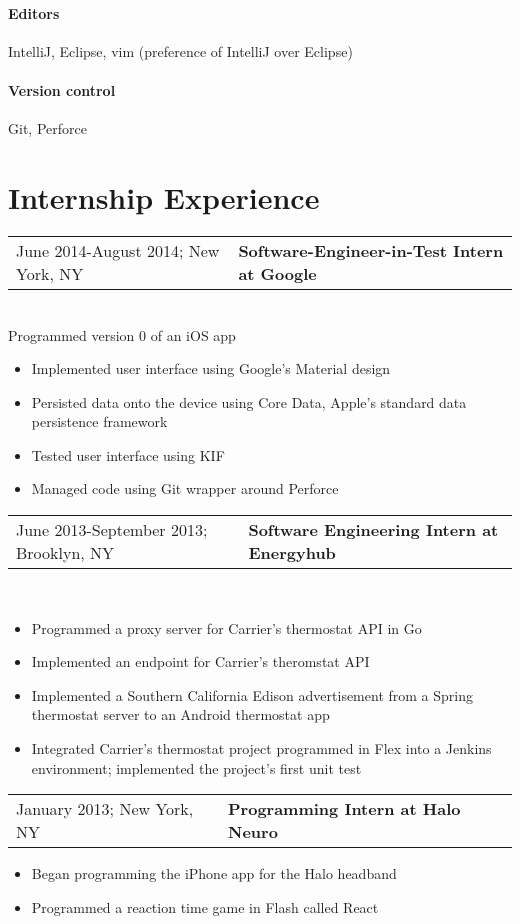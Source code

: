 \documentclass[letterpaper,10pt]{article} %
\begin{document}
\paragraph{Editors} IntelliJ, Eclipse, vim {\footnotesize (preference of IntelliJ over Eclipse)}
\paragraph{Version control} Git, Perforce

\section{Internship Experience}
\begin{tabular}{@{}p{3in}l}
    June 2014-August 2014; New York, NY & \textbf{Software-Engineer-in-Test Intern at Google}
\end{tabular} \\
Programmed version 0 of an iOS app
\begin{itemize}
    \item Implemented user interface using Google's Material design
    \item Persisted data onto the device using Core Data, Apple's standard data persistence framework
    \item Tested user interface using KIF
    \item Managed code using Git wrapper around Perforce
\end{itemize}

\begin{tabular}{@{}p{3in}l}
    June 2013-September 2013; Brooklyn, NY & \textbf{Software Engineering Intern at Energyhub}
\end{tabular} \\
\begin{itemize}
    \item Programmed a proxy server for Carrier's thermostat API in Go
    \item Implemented an endpoint for Carrier's theromstat API
    \item
        Implemented a Southern California Edison advertisement from a Spring thermostat server
        to an Android thermostat app
    \item
        Integrated Carrier’s thermostat project programmed in Flex into a Jenkins environment;
        implemented the project’s first unit test
\end{itemize}

\begin{tabular}{@{}p{3in}l}
    January 2013; New York, NY & \textbf{Programming Intern at Halo Neuro}
\end{tabular}
\begin{itemize}
    \item Began programming the iPhone app for the Halo headband
    \item Programmed a reaction time game in Flash called React
\end{itemize}
\end{document}
